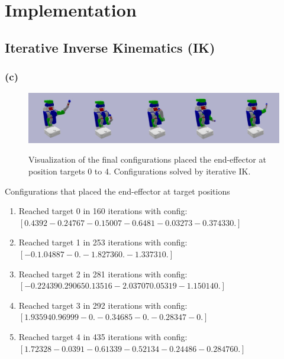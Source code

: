 \documentclass{article}
\theoremstyle{definition} %
\begin{document}
\section*{Implementation}

\subsection*{Iterative Inverse Kinematics (IK)}
\subsubsection*{(c)}
\begin{figure}[H]
    \centering
        \textsf{\includegraphics[width=0.9\columnwidth]{ik_target_group.png}}
        \caption{Visualization of the final configurations placed the end-effector at position targets 0 to 4. Configurations solved by iterative IK.}
        \label{fig:ik}
\end{figure}

Configurations that placed the end-effector at target positions
\begin{enumerate}
    \item Reached target 0 in 160 iterations with config:\\
    $[ 0.4392  -0.24767 -0.15007 -0.6481  -0.03273 -0.37433  0.     ]$
    \item Reached target 1 in 253 iterations with config:\\
    $[-0.       1.04887 -0.      -1.82736  0.      -1.33731  0.     ]$
    \item Reached target 2 in 281 iterations with config:\\
    $[-0.22439  0.29065  0.13516 -2.03707  0.05319 -1.15014  0.     ]$
    \item Reached target 3 in 292 iterations with config:\\
    $[ 1.93594  0.96999 -0.      -0.34685 -0.      -0.28347 -0.     ]$
    \item Reached target 4 in 435 iterations with config:\\
    $[ 1.72328 -0.0391  -0.61339 -0.52134 -0.24486 -0.28476  0.     ]$
\end{enumerate}
\end{document}
